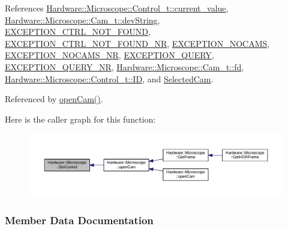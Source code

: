 References \hyperlink{_microscope_8h_source_l00085}{Hardware\+::\+Microscope\+::\+Control\+\_\+t\+::current\+\_\+value}, \hyperlink{_microscope_8h_source_l00124}{Hardware\+::\+Microscope\+::\+Cam\+\_\+t\+::dev\+String}, \hyperlink{_microscope_not_found_exception_8h_source_l00015}{E\+X\+C\+E\+P\+T\+I\+O\+N\+\_\+\+C\+T\+R\+L\+\_\+\+N\+O\+T\+\_\+\+F\+O\+U\+N\+D}, \hyperlink{_microscope_not_found_exception_8h_source_l00016}{E\+X\+C\+E\+P\+T\+I\+O\+N\+\_\+\+C\+T\+R\+L\+\_\+\+N\+O\+T\+\_\+\+F\+O\+U\+N\+D\+\_\+\+N\+R}, \hyperlink{_microscope_not_found_exception_8h_source_l00009}{E\+X\+C\+E\+P\+T\+I\+O\+N\+\_\+\+N\+O\+C\+A\+M\+S}, \hyperlink{_microscope_not_found_exception_8h_source_l00010}{E\+X\+C\+E\+P\+T\+I\+O\+N\+\_\+\+N\+O\+C\+A\+M\+S\+\_\+\+N\+R}, \hyperlink{_microscope_not_found_exception_8h_source_l00011}{E\+X\+C\+E\+P\+T\+I\+O\+N\+\_\+\+Q\+U\+E\+R\+Y}, \hyperlink{_microscope_not_found_exception_8h_source_l00012}{E\+X\+C\+E\+P\+T\+I\+O\+N\+\_\+\+Q\+U\+E\+R\+Y\+\_\+\+N\+R}, \hyperlink{_microscope_8h_source_l00131}{Hardware\+::\+Microscope\+::\+Cam\+\_\+t\+::fd}, \hyperlink{_microscope_8h_source_l00086}{Hardware\+::\+Microscope\+::\+Control\+\_\+t\+::\+I\+D}, and \hyperlink{_microscope_8h_source_l00149}{Selected\+Cam}.



Referenced by \hyperlink{_microscope_8cpp_source_l00167}{open\+Cam()}.



Here is the caller graph for this function\+:
\nopagebreak
\begin{figure}[H]
\begin{center}
\leavevmode
\includegraphics[width=350pt]{class_hardware_1_1_microscope_a3b963a4b53aae0e215a20e9d59493e48_icgraph}
\end{center}
\end{figure}




\subsubsection{Member Data Documentation}
\hypertarget{class_hardware_1_1_microscope_a49a52c74d900f217ed190d36b29ff27d}{}
